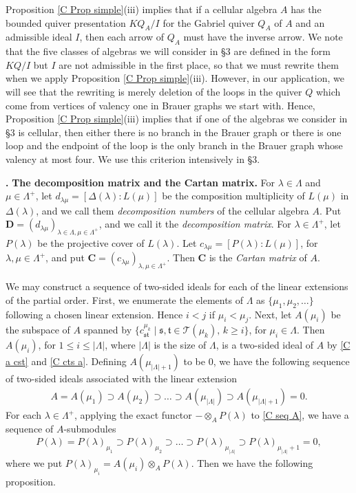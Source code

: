 \documentclass[12pt]{amsart}
\def \para{\refstepcounter{thm} \par\medskip\noindent
                \textbf{\thethm .} }
\numberwithin{equation}{thm}
\newcommand\bC{\mathbf C}
\newcommand\bD{\mathbf D}
\newcommand\cT{\mathcal{T}}
\newcommand\fs{\mathfrak s}
\newcommand\ft{\mathfrak t}
\newcommand\la{\lambda}
\newcommand\D{\Delta}
\newcommand\vL{\varLambda}
\newcounter{ni}
\begin{document}
Proposition \ref{C Prop simple}(iii) implies that if a cellular algebra $A$ has the bounded quiver presentation $KQ_A/I$ 
for the Gabriel quiver $Q_A$ of $A$ and an admissible ideal $I$, 
then each arrow of $Q_A$ must have the inverse arrow. We note that the five classes of algebras we will consider in \S3 are 
defined in the form $KQ/I$ but $I$ are not admissible in the first place, so that we must rewrite them when we apply Proposition \ref{C Prop simple}(iii).
However, in our application, we will see that the rewriting is merely deletion of the loops in the quiver $Q$ which come from vertices of valency 
one in Brauer graphs we start with.
Hence, Proposition \ref{C Prop simple}(iii) implies that if one of the algebras we consider in \S3 is cellular, then 
either there is no branch in the Brauer graph or 
there is one loop and the endpoint of the loop is the only branch in the Brauer graph whose valency at most four.
We use this criterion intensively in \S3.


\para {\bf The decomposition matrix and the Cartan matrix.}
For $\la \in \vL$ and $\mu \in \vL^+$, 
let $d_{\la\mu}=[\D(\la):L(\mu)]$ be the composition multiplicity of $L(\mu)$ in $\D(\la)$, 
and we call them \emph{decomposition numbers} of the cellular algebra $A$. 
Put $\bD=(d_{\la \mu})_{\la \in \vL, \mu \in \vL^+}$, and we call it the \emph{decomposition matrix}. 
For $\la\in \vL^+$, let $P(\la)$ be the projective cover of $L(\la)$. 
Let $c_{\la\mu} = [P(\la) : L(\mu)]$, for $\la, \mu \in \vL^+$, and put $\bC =(c_{\la \mu})_{\la,\mu \in \vL^+}$. 
Then $\bC$ is the \emph{Cartan matrix} of $A$. 

We may construct a sequence of two-sided ideals for each of the linear extensions of the partial order. First, 
we enumerate the elements of $\vL$ as $\{\mu_1,\mu_2,\dots \}$ following a chosen linear extension. Hence $i < j$ if $\mu_i < \mu_j$. Next,
let $A(\mu_i)$ be the subspace of $A$ spanned by $\{c_{\fs \ft}^{\mu_k} \mid \fs, \ft \in \cT(\mu_k), \, k \geq i\}$, for $\mu_i \in \vL$. 
Then $A(\mu_i)$, for $1\le i \le |\vL|$, where $|\vL|$ is the size of $\vL$, is a two-sided ideal of $A$ by \eqref{C a cst} and \eqref{C cts a}. Defining $ A(\mu_{|\vL|+1})$ to be $0$, 
we have the following sequence of two-sided ideals associated with the linear extension
\begin{align}
\label{C seq A}
A= A(\mu_1) \supset A(\mu_2) \supset \dots \supset A(\mu_{|\vL|}) \supset A(\mu_{|\vL|+1})=0.
\end{align}  
For each $\la \in \vL^+$, applying the exact functor $- \otimes_{A} P(\la)$ to \eqref{C seq A}, 
we have a sequence of $A$-submodules 
\begin{align} 
\label{C seq Pla}
P(\la) = P(\la)_{\mu_1} \supset P(\la)_{\mu_2} \supset \dots \supset P(\la)_{\mu_{|\vL|}} \supset P(\la)_{\mu_{|\vL|}+1}=0, 
\end{align}
where we put $P(\la)_{\mu_i} = A(\mu_i) \otimes_{A} P(\la)$. 
Then we have the following proposition. 
\end{document}
